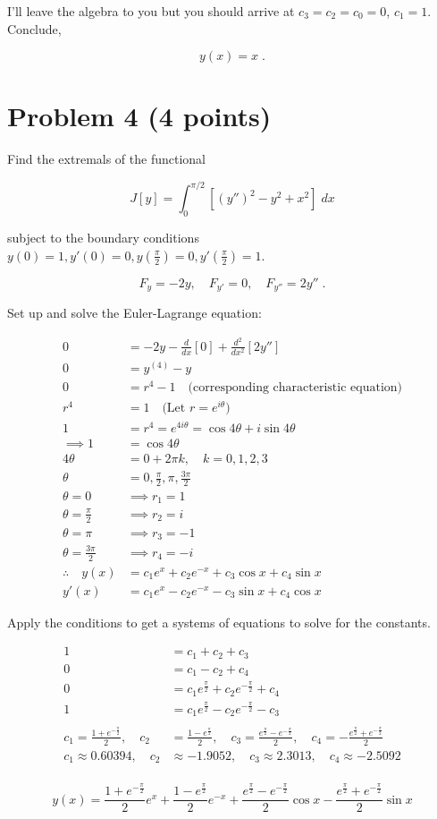 \documentclass[a4paper]{article}
\begin{document}
I'll leave the algebra to you but you should arrive at $c_3=c_2=c_0 = 0$, $c_1 = 1$. Conclude,

$$y(x) = x \;.$$

\newpage


\section*{Problem 4 (4 points)}

Find the extremals of the functional

$$J[y] = \int_0^{\pi /2} \left[(y'')^2 - y^2 + x^2 \right] \; dx $$

subject to the boundary conditions $y(0) = 1, y'(0) = 0, y(\frac{\pi}{2}) = 0, y'(\frac{\pi}{2}) = 1$.

$$ F_y = -2y, \quad F_{y'} = 0, \quad F_{y''} = 2y'' \;.$$

Set up and solve the Euler-Lagrange equation:

\begin{align*}
0 &= -2y - \frac{d}{dx}[0] + \frac{d^2}{dx^2}[2y''] \\
0 &= y^{(4)} - y \\
0 &= r^4 - 1 \quad \text{(corresponding characteristic equation)}\\
r^4 &= 1 \quad \text{(Let } r = e^{i\theta} \text{)} \\
1 &= r^4 = e^{4i\theta} = \cos 4\theta + i \sin 4 \theta \\
\implies 1 &= \cos 4\theta \\
4\theta &= 0 + 2\pi k, \quad k = 0,1,2,3 \\
\theta &= 0, \frac{\pi}{2}, \pi, \frac{3\pi}{2}\\
\theta = 0 &\implies r_1 = 1 \\
\theta = \frac{\pi}{2} &\implies r_2 = i \\
\theta = \pi &\implies r_3 = -1 \\
\theta = \frac{3\pi}{2} & \implies r_4 = -i \\
\therefore \quad y(x) &= c_1e^x + c_2e^{-x} + c_3 \cos x + c_4 \sin x \\
y'(x) &= c_1 e^x - c_2e^{-x} - c_3 \sin x + c_4 \cos x
\end{align*}

Apply the conditions to get a systems of equations to solve for the constants.

\begin{align*}
1 &= c_1 + c_2 + c_3 \\
0 &= c_1 - c_2 + c_4 \\
0 &= c_1 e^{\frac{\pi}{2}} + c_2 e^{-\frac{\pi}{2}} + c_4 \\
1 &= c_1e^{\frac{\pi}{2}} - c_2 e^{-\frac{\pi}{2}} - c_3 \\
& \\
c_1 = \frac{1+e^{-\frac{\pi}{2}}}{2}, \quad c_2 &= \frac{1-e^{\frac{\pi}{2}}}{2}, \quad c_3 = \frac{e^{\frac{\pi}{2}} - e^{-\frac{\pi}{2}}}{2}, \quad c_4 = -\frac{e^{\frac{\pi}{2}} + e^{-\frac{\pi}{2}}}{2} \\
c_1 \approx 0.60394, \quad c_2 & \approx -1.9052, \quad c_3 \approx 2.3013, \quad c_4 \approx -2.5092 \\
\end{align*}

$$ y(x) = \frac{1+e^{-\frac{\pi}{2}}}{2}e^x + \frac{1-e^{\frac{\pi}{2}}}{2}e^{-x} + \frac{e^{\frac{\pi}{2}} - e^{-\frac{\pi}{2}}}{2}\cos x - \frac{e^{\frac{\pi}{2}} + e^{-\frac{\pi}{2}}}{2} \sin x $$
\end{document}
